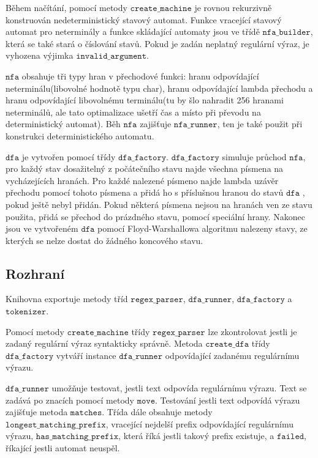 \documentclass{article}
\begin{document}
Během načítání, pomocí metody $\texttt{create\_machine}$ je rovnou rekurzivně konstruován nedeterministický stavový automat. Funkce vracející stavový automat pro neterminály a funkce skládající automaty jsou ve třídě $\texttt{nfa\_builder}$, která se také stará o číslování stavů. Pokud je zadán neplatný regulární výraz, je vyhozena výjimka $\texttt{invalid\_argument}$.

$\texttt{nfa}$ obsahuje tři typy hran v přechodové funkci: hranu odpovídající neterminálu(libovolné hodnotě typu char), hranu odpovídající lambda přechodu a hranu odpovídající libovolnému terminálu(tu by šlo nahradit 256 hranami neterminálů, ale tato optimalizace ušetří čas a místo při převodu na deterministický automat). Běh $\texttt{nfa}$ zajišťuje $\texttt{nfa\_runner}$, ten je také použit při konstrukci deterministického automatu.

$\texttt{dfa}$ je vytvořen pomocí třídy $\texttt{dfa\_factory}$. $\texttt{dfa\_factory}$ simuluje průchod $\texttt{nfa}$, pro každý stav dosažitelný z počátečního stavu najde všechna písmena na vycházejících hranách. Pro každé nalezené písmeno najde lambda uzávěr přechodu pomocí tohoto písmena a přidá ho s příslušnou hranou do stavů $\texttt{dfa}$ , pokud ještě nebyl přidán. Pokud některá písmena nejsou na hranách ven ze stavu použita, přidá se přechod do prázdného stavu, pomocí speciální hrany. Nakonec jsou ve vytvořeném $\texttt{dfa}$ pomocí Floyd-Warshallowa algoritmu nalezeny stavy, ze kterých se nelze dostat do žádného koncového stavu.

\subsection*{Rozhraní}

Knihovna exportuje metody tříd $\texttt{regex\_parser}$, $\texttt{dfa\_runner}$, $\texttt{dfa\_factory}$ a $\texttt{tokenizer}$.

 Pomocí metody $\texttt{create\_machine}$ třídy $\texttt{regex\_parser}$ lze zkontrolovat jestli je zadaný regulární výraz syntakticky správně. Metoda $\texttt{create\_dfa}$ třídy $\texttt{dfa\_factory}$ vytváří instance $\texttt{dfa\_runner}$ odpovídající zadanému regulárnímu výrazu.

$\texttt{dfa\_runner}$ umožňuje testovat, jestli text odpovída regulárnímu výrazu. Text se zadává po znacích pomocí metody $\texttt{move}$. Testování jestli text odpovídá výrazu zajišťuje metoda $\texttt{matches}$. Třída dále obsahuje metody $\texttt{longest\_matching\_prefix}$, vracející nejdelší prefix odpovídající regulárnímu výrazu, $\texttt{has\_matching\_prefix}$, která říká jestli takový prefix existuje, a $\texttt{failed}$, říkající jestli automat neuspěl.
\end{document}
